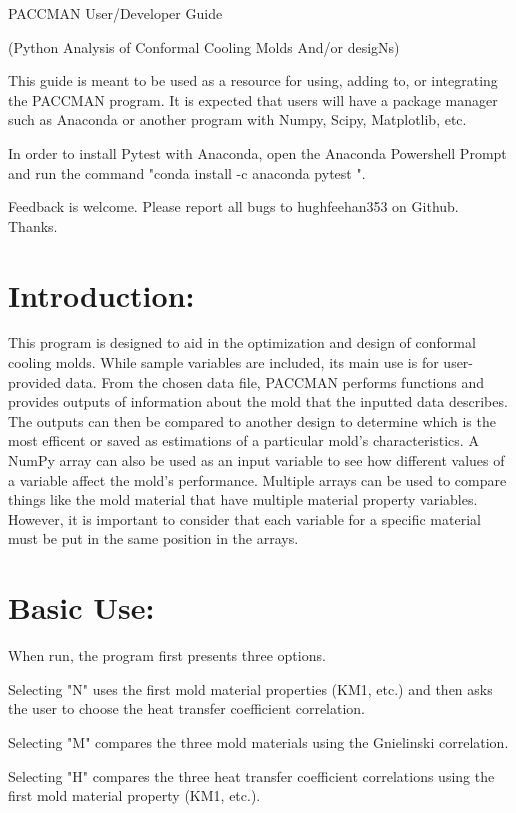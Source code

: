 \documentclass[a4paper,12pt]{article}
\begin{document}
\setlength{\parindent}{0em}
\doublespacing
\captionsetup{labelformat=empty}


\begin{center}
{\huge PACCMAN User/Developer Guide}

(Python Analysis of Conformal Cooling Molds And/or desigNs)
\end{center}

\bigskip


This guide is meant to be used as a resource for using, adding to, or integrating the PACCMAN program. 
It is expected that users will have a package manager such as Anaconda or another program with Numpy, Scipy, Matplotlib, etc.

\medskip

In order to install Pytest with Anaconda, open the Anaconda Powershell Prompt and run the command "conda install -c anaconda pytest ".

\medskip

Feedback is welcome. Please report all bugs to hughfeehan353 on Github. Thanks.

\section*{Introduction:}

This program is designed to aid in the optimization and design of conformal cooling molds. While sample variables are included, its main use is for user-provided data. From the chosen data file, PACCMAN performs functions and provides outputs of information about the mold that the inputted data describes. The outputs can then be compared to another design to determine which is the most efficent or saved as estimations of a particular mold's characteristics. A NumPy array can also be used as an input variable to see how different values of a  variable affect the mold's performance. Multiple arrays can be used to compare things like the mold material that have multiple material property variables. However, it is important to  consider that each variable for a specific material must be put in the same position in the arrays.

\clearpage

\section*{Basic Use:}

When run, the program first presents three options.
\begin{adjustwidth}{1cm}{}
Selecting "N" uses the first mold material properties (KM1, etc.) and then asks the user to choose the heat transfer coefficient correlation.

Selecting "M" compares the three mold materials using the Gnielinski correlation.

Selecting "H" compares the three heat transfer coefficient correlations using the first mold material property (KM1, etc.).
\end{adjustwidth}
\end{document}
